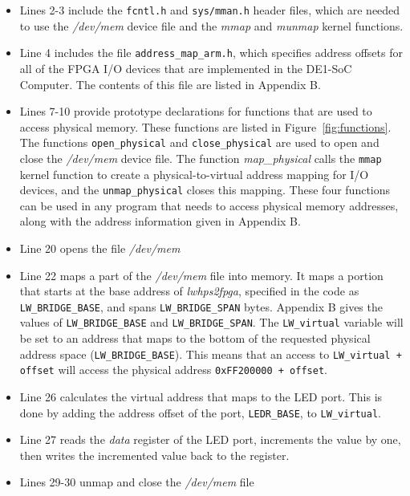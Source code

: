 \documentclass[11pt, twoside, pdftex]{article}
\begin{document}
\begin{itemize} \itemsep1pt \parskip0pt 
\item Lines 2-3 include the \texttt{fcntl.h} and \texttt{sys/mman.h} header files, which are 
needed to use the {\it /dev/mem} device file and the \textit{mmap} and 
\textit{munmap} kernel functions.
\item Line 4 includes the file \texttt{address\_map\_arm.h}, which specifies address offsets 
for all of the FPGA I/O devices that are implemented in the DE1-SoC Computer. The contents of 
this file are listed in Appendix B.
\item Lines 7-10 provide prototype declarations for functions that are used to access physical 
memory. These functions are listed in Figure~\ref{fig:functions}. The functions 
\texttt{open\_physical} and \texttt{close\_physical} are used to open and close the 
{\it /dev/mem} device file. The function {\it map\_physical} calls the \texttt{mmap} kernel 
function to create a physical-to-virtual address mapping for I/O devices, and the 
\texttt{unmap\_physical} closes this mapping. These four functions can be used in any program 
that needs to access physical memory addresses, along with the address information given
in Appendix B.
\newpage
\item Line 20 opens the file \textit{/dev/mem}
\item Line 22 maps a part of the \textit{/dev/mem} file into memory. It maps 
a portion that starts at the base address of {\it lwhps2fpga}, specified in the code as 
\texttt{LW\_BRIDGE\_BASE}, and spans \texttt{LW\_BRIDGE\_SPAN} bytes. Appendix B gives the
values of \texttt{LW\_BRIDGE\_BASE} and \texttt{LW\_BRIDGE\_SPAN}. 
The \texttt{LW\_virtual} variable 
will be set to an address that maps to the bottom of the requested physical address space 
(\texttt{LW\_BRIDGE\_BASE}). 
This means that an access to \texttt{LW\_virtual + offset} will access the physical address 
\texttt{0xFF200000 + offset}.
\item Line 26 calculates the virtual address that maps to the LED port. This is done by adding 
the address offset of the port, \texttt{LEDR\_BASE}, to \texttt{LW\_virtual}.
\item Line 27 reads the \textit{data} register of the LED port, increments the value by 
one, then writes the incremented value back to the register.
\item Lines 29-30 unmap and close the {\it /dev/mem} file
\end{itemize}
\end{document}
